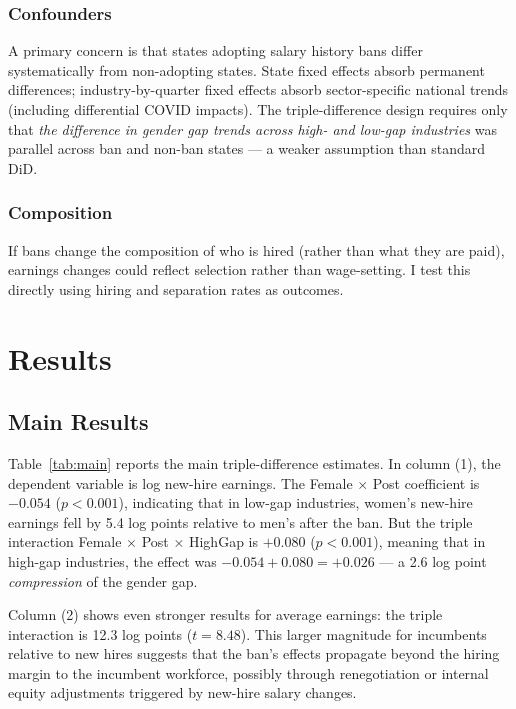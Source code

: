 \documentclass[12pt]{article}
\begin{document}
\subsubsection*{Confounders} A primary concern is that states adopting salary history bans differ systematically from non-adopting states. State fixed effects absorb permanent differences; industry-by-quarter fixed effects absorb sector-specific national trends (including differential COVID impacts). The triple-difference design requires only that \emph{the difference in gender gap trends across high- and low-gap industries} was parallel across ban and non-ban states --- a weaker assumption than standard DiD.

\subsubsection*{Composition} If bans change the composition of who is hired (rather than what they are paid), earnings changes could reflect selection rather than wage-setting. I test this directly using hiring and separation rates as outcomes.


\section{Results}
\label{sec:results}

\subsection{Main Results}



Table~\ref{tab:main} reports the main triple-difference estimates. In column (1), the dependent variable is log new-hire earnings. The Female $\times$ Post coefficient is $-0.054$ ($p < 0.001$), indicating that in low-gap industries, women's new-hire earnings fell by 5.4 log points relative to men's after the ban. But the triple interaction Female $\times$ Post $\times$ HighGap is $+0.080$ ($p < 0.001$), meaning that in high-gap industries, the effect was $-0.054 + 0.080 = +0.026$ --- a 2.6 log point \emph{compression} of the gender gap.

Column (2) shows even stronger results for average earnings: the triple interaction is 12.3 log points ($t = 8.48$). This larger magnitude for incumbents relative to new hires suggests that the ban's effects propagate beyond the hiring margin to the incumbent workforce, possibly through renegotiation or internal equity adjustments triggered by new-hire salary changes.
\end{document}
